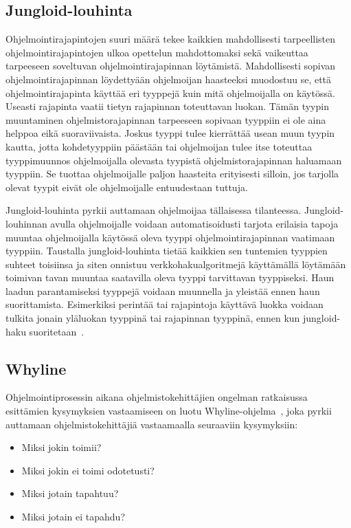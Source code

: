 \documentclass[finnish]{tktltiki2}
\theoremstyle{definition}
\theoremstyle{remark}
\begin{document}
\subsection{Jungloid-louhinta}
\label{ch:jungloid}
Ohjelmointirajapintojen suuri määrä tekee kaikkien mahdollisesti tarpeellisten ohjelmointirajapintojen ulkoa opettelun mahdottomaksi sekä vaikeuttaa tarpeeseen soveltuvan ohjelmointirajapinnan löytämistä. Mahdollisesti sopivan ohjelmointirajapinnan löydettyään ohjelmoijan haasteeksi muodostuu se, että ohjelmointirajapinta käyttää eri tyyppejä kuin mitä ohjelmoijalla on käytössä. Useasti rajapinta vaatii tietyn rajapinnan toteuttavan luokan. Tämän tyypin muuntaminen ohjelmistorajapinnan tarpeeseen sopivaan tyyppiin ei ole aina helppoa eikä suoraviivaista. Joskus tyyppi tulee kierrättää usean muun tyypin kautta, jotta kohdetyyppiin päästään tai ohjelmoijan tulee itse toteuttaa tyyppimuunnos ohjelmoijalla olevasta tyypistä ohjelmistorajapinnan haluamaan tyyppiin. Se tuottaa ohjelmoijalle paljon haasteita erityisesti silloin, jos tarjolla olevat tyypit eivät ole ohjelmoijalle entuudestaan tuttuja.

Jungloid-louhinta pyrkii auttamaan ohjelmoijaa tällaisessa tilanteessa. Jungloid-louhinnan avulla ohjelmoijalle voidaan automatisoidusti tarjota erilaisia tapoja muuntaa ohjelmoijalla käytössä oleva tyyppi ohjelmointirajapinnan vaatimaan tyyppiin. Taustalla jungloid-louhinta tietää kaikkien sen tuntemien tyyppien suhteet toisiinsa ja siten onnistuu verkkohakualgoritmejä käyttämällä löytämään toimivan tavan muuntaa saatavilla oleva tyyppi tarvittavan tyyppiseksi. Haun laadun parantamiseksi tyyppejä voidaan muunnella ja yleistää ennen haun suorittamista. Esimerkiksi perintää tai rajapintoja käyttävä luokka voidaan tulkita jonain yläluokan tyyppinä tai rajapinnan tyyppinä, ennen kun jungloid-haku suoritetaan~\cite{jungloid-mining}.

\subsection{Whyline}
Ohjelmointiprosessin aikana ohjelmistokehittäjien ongelman ratkaisussa esittämien kysymyksien vastaamiseen on luotu Whyline-ohjelma~\cite{whyline}, joka pyrkii auttamaan ohjelmistokehittäjiä vastaamaalla seuraaviin kysymyksiin:

\begin{itemize}
  \item Miksi jokin toimii?
  \item Miksi jokin ei toimi odotetusti?
  \item Miksi jotain tapahtuu?
  \item Miksi jotain ei tapahdu?
\end{itemize}
\end{document}
